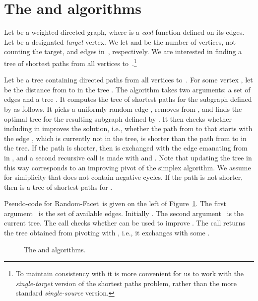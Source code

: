 \documentclass[twoside,11pt]{article}
\newcommand{\RandomFacet}{\mbox{\sc Random-}\allowbreak\mbox{\sc Facet}}
\begin{document}
\section{The  and  algorithms}\label{sec:algorithms}

Let  be a weighted directed graph, where  is a \emph{cost} function defined on its edges. Let  be a designated \emph{target} vertex. We let  and  be the number of vertices, not counting the target, and edges in~, respectively. We are interested in finding a tree of shortest paths from all vertices to~.\footnote{To maintain consistency with \cite{FriedmannHansenZwick/SODA11,FriedmannHansenZwick/STOC11} it is more convenient for us to work with the \emph{single-target} version of the shortest paths problem, rather than the more standard \emph{single-source} version.}

Let  be a tree containing directed paths from all vertices to~. For some vertex , let  be the distance from  to  in the tree . The  algorithm takes two arguments: a set of edges  and a tree . It computes the tree of shortest paths for the subgraph defined by  as follows. It picks a uniformly random edge , removes  from , and finds the optimal tree  for the resulting subgraph defined by . It then checks whether including  in  improves the solution, i.e., whether the path from  to  that starts with the edge , which is currently not in the tree, is shorter than the path from  to  in the tree. If the path is shorter, then  is exchanged with the edge  emanating from  in , and a second recursive call is made with  and . Note that updating the tree in this way corresponds to an improving pivot of the simplex algorithm. We assume for simiplicity that  does not contain negative cycles. If the path is not shorter, then  is a tree of shortest paths for .

Pseudo-code for \RandomFacet\ is given on the left of Figure~\ref{F-RandomFacet}. The first argument~
is the set of available edges. Initially . The second argument~ is the current tree.
The call  checks whether  can be used to improve .
The call  returns the tree obtained from pivoting with , i.e., it exchanges  with some .

\begin{figure}[t]
\begin{center}
\parbox{3.2in}{
\begin{function}[H]
\DontPrintSemicolon
\SetAlgoRefName{}
\eIf{}
{\Return{}\;}
{
     \;
     \;
    \eIf{}
    {
         \;
        \Return{}\;
    }
    {
      \Return{}\;
    }
}
\caption{\RandomFacet()}
\end{function}
}
\hspace*{10pt}
\parbox{3.2in}{
\begin{function}[H]
\DontPrintSemicolon
\SetAlgoRefName{}
\eIf{}
{\Return{}\;}
{
     \;
     \;
    \eIf{}
    {
         \;
        \Return{}\;
    }
    {
      \Return{}\;
    }
}
\caption{()}
\end{function}
}
\end{center}
\caption{The  and  algorithms.}\label{F-RandomFacet}
\end{figure}
\end{document}
